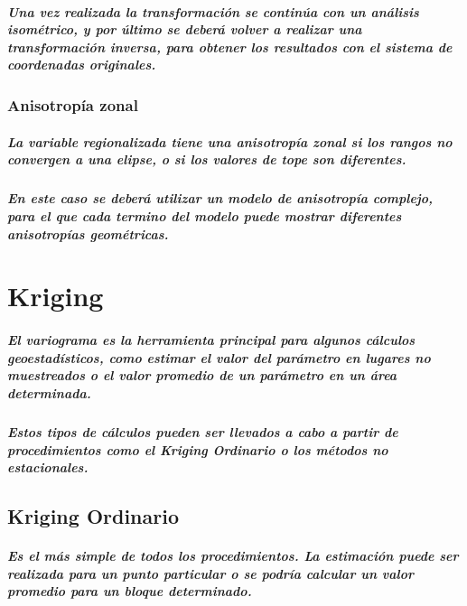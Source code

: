 \paragraph{
Una vez realizada la transformación se continúa con un análisis \emph{isométrico}, y por último se deberá volver a realizar una transformación inversa, para obtener los resultados con el sistema de coordenadas originales.
}


\subsection{Anisotropía zonal}
\paragraph{
La variable regionalizada tiene una \emph{anisotropía zonal} si los \emph{rangos} no convergen a una elipse, o si los valores de \emph{tope} son diferentes.
}
\paragraph{
En este caso se deberá utilizar un modelo de anisotropía complejo, para el que cada termino del modelo puede mostrar diferentes \emph{anisotropías geométricas}.
}




\chapter{Kriging}
\paragraph{
El variograma es la herramienta principal para algunos cálculos \emph{geoestadísticos}, como estimar el valor del parámetro en lugares no muestreados o el valor promedio de un parámetro en un área determinada.
}
\paragraph*{
Estos tipos de cálculos pueden ser llevados a cabo a partir de procedimientos como  el \emph{Kriging Ordinario} o los \emph{métodos no estacionales}.
}



\section{Kriging Ordinario}
\paragraph{
Es el más simple de todos los procedimientos. La estimación puede ser realizada para un punto particular o se podría calcular un valor promedio para un bloque determinado.
}


